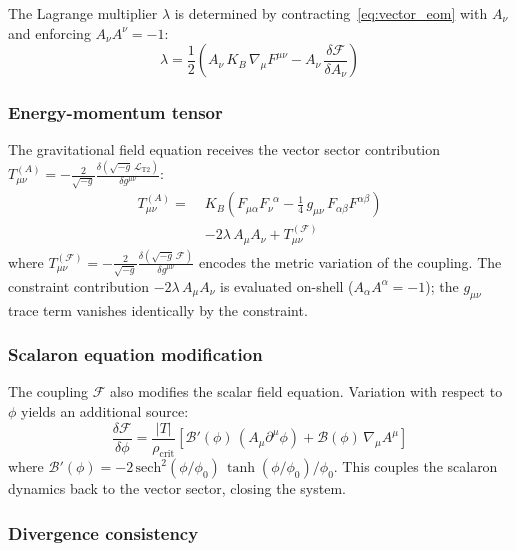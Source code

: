 \documentclass[aps,prd,twocolumn,superscriptaddress,nofootinbib]{revtex4-2}
\begin{document}
The Lagrange multiplier $\lambda$ is determined by contracting~\eqref{eq:vector_eom} with $A_\nu$ and enforcing $A_\nu A^\nu = -1$:
\begin{equation}
\lambda = \frac{1}{2}\left(A_\nu\,K_B\,\nabla_\mu F^{\mu\nu} - A_\nu\,\frac{\delta\mathcal{F}}{\delta A_\nu}\right)
\label{eq:lambda}
\end{equation}

\subsubsection{Energy-momentum tensor}

The gravitational field equation receives the vector sector contribution $T^{(A)}_{\mu\nu} = -\frac{2}{\sqrt{-g}}\frac{\delta(\sqrt{-g}\,\mathcal{L}_{\mathrm{T2}})}{\delta g^{\mu\nu}}$:
\begin{align}
T^{(A)}_{\mu\nu} = \;&K_B\!\left(F_{\mu\alpha}F_\nu^{\phantom{\nu}\alpha} - \tfrac{1}{4}\,g_{\mu\nu}\,F_{\alpha\beta}F^{\alpha\beta}\right) \nonumber\\
&- 2\lambda\,A_\mu A_\nu + T^{(\mathcal{F})}_{\mu\nu}
\label{eq:T_vector}
\end{align}
where $T^{(\mathcal{F})}_{\mu\nu} = -\frac{2}{\sqrt{-g}}\frac{\delta(\sqrt{-g}\,\mathcal{F})}{\delta g^{\mu\nu}}$ encodes the metric variation of the coupling. The constraint contribution $-2\lambda\,A_\mu A_\nu$ is evaluated on-shell ($A_\alpha A^\alpha = -1$); the $g_{\mu\nu}$ trace term vanishes identically by the constraint.

\subsubsection{Scalaron equation modification}

The coupling $\mathcal{F}$ also modifies the scalar field equation. Variation with respect to $\phi$ yields an additional source:
\begin{equation}
\frac{\delta\mathcal{F}}{\delta\phi} = \frac{|T|}{\rho_{\mathrm{crit}}}\left[\mathcal{B}'(\phi)\,(A_\mu\partial^\mu\phi) + \mathcal{B}(\phi)\,\nabla_\mu A^\mu\right]
\label{eq:scalar_source}
\end{equation}
where $\mathcal{B}'(\phi) = -2\,\mathrm{sech}^2(\phi/\phi_0)\,\tanh(\phi/\phi_0)/\phi_0$. This couples the scalaron dynamics back to the vector sector, closing the system.

\subsubsection{Divergence consistency}
\end{document}
